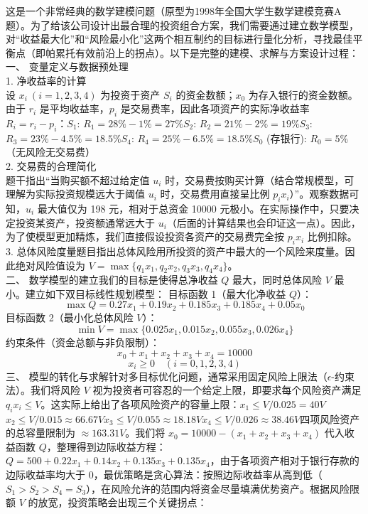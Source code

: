\documentclass[UTF8]{article}
\begin{document}
这是一个非常经典的数学建模问题（原型为1998年全国大学生数学建模竞赛A题）。为了给该公司设计出最合理的投资组合方案，我们需要通过建立数学模型，对“收益最大化”和“风险最小化”这两个相互制约的目标进行量化分析，寻找最佳平衡点（即帕累托有效前沿上的拐点）。以下是完整的建模、求解与方案设计过程：\\
一、 变量定义与数据预处理\\
1. 净收益率的计算\\
设 $x_i \ (i=1,2,3,4)$ 为投资于资产 $S_i$ 的资金数额；$x_0$ 为存入银行的资金数额。由于 $r_i$ 是平均收益率，$p_i$ 是交易费率，因此各项资产的实际净收益率 $R_i = r_i - p_i$：$S_1$: $R_1 = 28\% - 1\% = 27\%$$S_2$: $R_2 = 21\% - 2\% = 19\%$$S_3$: $R_3 = 23\% - 4.5\% = 18.5\%$$S_4$: $R_4 = 25\% - 6.5\% = 18.5\%$$S_0$ (存银行): $R_0 = 5\%$（无风险无交易费）\\
2. 交易费的合理简化\\
题干指出“当购买额不超过给定值 $u_i$ 时，交易费按购买计算（结合常规模型，可理解为实际投资规模远大于阈值 $u_i$ 时，交易费用直接呈比例 $p_i x_i$）”。观察数据可知，$u_i$ 最大值仅为 198 元，相对于总资金 10000 元极小。在实际操作中，只要决定投资某资产，投资额通常远大于 $u_i$（后面的计算结果也会印证这一点）。因此，为了使模型更加精炼，我们直接假设投资各资产的交易费完全按 $p_i x_i$ 比例扣除。\\
3. 总体风险度量题目指出总体风险用所投资的资产中最大的一个风险来度量。因此绝对风险值设为 $V = \max\{q_1 x_1, q_2 x_2, q_3 x_3, q_4 x_4\}$。\\
二、 数学模型的建立我们的目标是使得总净收益 $Q$ 最大，同时总体风险 $V$ 最小。建立如下双目标线性规划模型：
目标函数 1（最大化净收益 $Q$）：$$ \max Q = 0.27x_1 + 0.19x_2 + 0.185x_3 + 0.185x_4 + 0.05x_0 $$
目标函数 2（最小化总体风险 $V$）：$$ \min V = \max\{0.025x_1, 0.015x_2, 0.055x_3, 0.026x_4\} $$
约束条件（资金总额与非负限制）：$$ x_0 + x_1 + x_2 + x_3 + x_4 = 10000 $$$$ x_i \ge 0 \quad (i=0, 1, 2, 3, 4) $$
三、 模型的转化与求解针对多目标优化问题，通常采用固定风险上限法（$\epsilon$-约束法）。我们将风险 $V$ 视为投资者可容忍的一个给定上限，即要求每个风险资产满足 $q_i x_i \le V$。这实际上给出了各项风险资产的容量上限：$x_1 \le V / 0.025 = 40V$$x_2 \le V / 0.015 \approx 66.67V$$x_3 \le V / 0.055 \approx 18.18V$$x_4 \le V / 0.026 \approx 38.46V$四项风险资产的总容量限制为 $\approx 163.31V$。我们将 $x_0 = 10000 - (x_1+x_2+x_3+x_4)$ 代入收益函数 $Q$，整理得到边际收益方程：$Q = 500 + 0.22x_1 + 0.14x_2 + 0.135x_3 + 0.135x_4$，由于各项资产相对于银行存款的边际收益率均大于 0，最优策略是贪心算法：按照边际收益率从高到低（$S_1 > S_2 > S_4 = S_3$），在风险允许的范围内将资金尽量填满优势资产。根据风险限额 $V$ 的放宽，投资策略会出现三个关键拐点：
\end{document}
